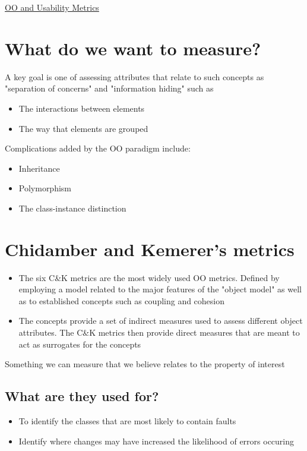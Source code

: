 \documentclass{article}[18pt]
\begin{document}
\begin{center}
\underline{\huge OO and Usability Metrics}
\end{center}
\section{What do we want to measure?}
A key goal is one of assessing attributes that relate to such concepts as "separation of concerns" and "information hiding" such as
\begin{itemize}
	\item The interactions between elements
	\item The way that elements are grouped
\end{itemize}
Complications added by the OO paradigm include:
\begin{itemize}
	\item Inheritance
	\item Polymorphism
	\item The class-instance distinction
\end{itemize}
\section{Chidamber and Kemerer's metrics}
\begin{itemize}
	\item The six C\&K metrics are the most widely used OO metrics. Defined by employing a model related to the major features of the "object model" as well as to established concepts such as coupling and cohesion
	\item The concepts provide a set of indirect measures used to assess different object attributes. The C\&K metrics then provide direct measures that are meant to act as surrogates for the concepts
\end{itemize}
\begin{definition}[Surrogate]
	Something we can measure that we believe relates to the property of interest
\end{definition}
\subsection{What are they used for?}
\begin{itemize}
	\item To identify the classes that are most likely to contain faults
	\item Identify where changes may have increased the likelihood of errors occuring
\end{itemize}
\end{document}
